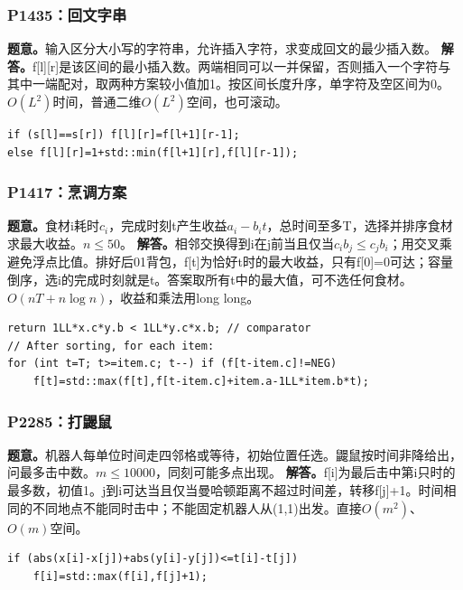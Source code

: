 \subsubsection{P1435：回文字串}
\textbf{题意。}输入区分大小写的字符串，允许插入字符，求变成回文的最少插入数。
\textbf{解答。}f[l][r]是该区间的最小插入数。两端相同可以一并保留，否则插入一个字符与其中一端配对，取两种方案较小值加1。按区间长度升序，单字符及空区间为0。$O(L^2)$时间，普通二维$O(L^2)$空间，也可滚动。
\begin{lstlisting}
if (s[l]==s[r]) f[l][r]=f[l+1][r-1];
else f[l][r]=1+std::min(f[l+1][r],f[l][r-1]);
\end{lstlisting}

\subsubsection{P1417：烹调方案}
\textbf{题意。}食材i耗时$c_i$，完成时刻t产生收益$a_i-b_it$，总时间至多T，选择并排序食材求最大收益。$n\le50$。
\textbf{解答。}相邻交换得到i在j前当且仅当$c_i b_j\le c_j b_i$；用交叉乘避免浮点比值。排好后01背包，f[t]为恰好t时的最大收益，只有f[0]=0可达；容量倒序，选i的完成时刻就是t。答案取所有t中的最大值，可不选任何食材。$O(nT+n\log n)$，收益和乘法用long long。
\begin{lstlisting}
return 1LL*x.c*y.b < 1LL*y.c*x.b; // comparator
// After sorting, for each item:
for (int t=T; t>=item.c; t--) if (f[t-item.c]!=NEG)
    f[t]=std::max(f[t],f[t-item.c]+item.a-1LL*item.b*t);
\end{lstlisting}

\subsubsection{P2285：打鼹鼠}
\textbf{题意。}机器人每单位时间走四邻格或等待，初始位置任选。鼹鼠按时间非降给出，问最多击中数。$m\le10000$，同刻可能多点出现。
\textbf{解答。}f[i]为最后击中第i只时的最多数，初值1。j到i可达当且仅当曼哈顿距离不超过时间差，转移f[j]+1。时间相同的不同地点不能同时击中；不能固定机器人从(1,1)出发。直接$O(m^2)$、$O(m)$空间。
\begin{lstlisting}
if (abs(x[i]-x[j])+abs(y[i]-y[j])<=t[i]-t[j])
    f[i]=std::max(f[i],f[j]+1);
\end{lstlisting}

